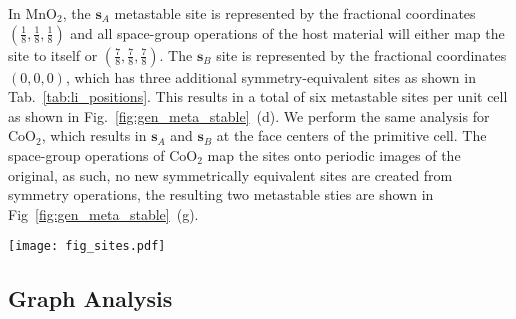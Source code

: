 \documentclass[reprint,preprintnumbers,amsmath,amssymb,aps,prl]{revtex4-1}
\begin{document}
In MnO$_2$, the $\mathbf{s}_A$ metastable site is represented by the fractional coordinates $\left(\frac{1}{8},\frac{1}{8},\frac{1}{8}\right)$ and all space-group operations of the host material will either map the site to itself or $\left(\frac{7}{8},\frac{7}{8},\frac{7}{8}\right)$.
The $\mathbf{s}_B$ site is represented by the fractional coordinates $(0,0,0)$, which has three additional symmetry-equivalent sites as shown in Tab.~\ref{tab:li_positions}.
This results in a total of six metastable sites per unit cell as shown in Fig.~\ref{fig:gen_meta_stable}~(d).
We perform the same analysis for CoO$_2$, which results in $\mathbf{s}_A$ and $\mathbf{s}_B$ at the face centers of the primitive cell.
The space-group operations of CoO$_2$ map the sites onto periodic images of the original, as such, no new symmetrically equivalent sites are created from symmetry operations, the resulting two metastable sties are shown in Fig~\ref{fig:gen_meta_stable}~(g).
%
\begin{figure*}[htb]
    \centering
    \texttt{[image: fig\_sites.pdf]}
    \caption{
        \label{fig:gen_meta_stable}
        Illustration of identified metastable sites in (a-d) MnO$_2$ and (e-g) CoO$_2$. (a-b) Crystal structure indicating the different relaxed atomic structures of MnO$_2$ after single Li insertion. (e-f) Crystal structure indicating the different relaxed atomic structures of CoO$_2$ after single Li insertion.
        (c) Crystal structure indicating the metastable Li position after mapping onto $S_{\rm base}$.
        (d,g) Crstyal structure with the full set of possible Li sites after symmetry operations. Note that the applied symmetry operations did not result in additional sites for CoO$_2$.
    }
\end{figure*}{}




\subsection{Graph Analysis}
\end{document}
